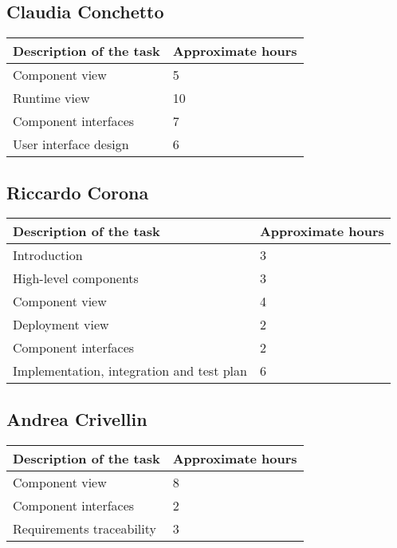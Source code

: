 
%

\subsection{Claudia Conchetto}
\begin{table}[h!]
\begin{tabular}{|l|l|}
\hline
\textbf{Description of the task} & \textbf{Approximate hours} \\ \hline
Component view & 5 \\ \hline
Runtime view & 10 \\ \hline
Component interfaces & 7 \\ \hline
User interface design & 6 \\ \hline
\end{tabular}
\end{table}

\subsection{Riccardo Corona}
\begin{table}[h!]
\begin{tabular}{|l|l|}
\hline
\textbf{Description of the task} & \textbf{Approximate hours} \\ \hline
Introduction & 3 \\ \hline
High-level components & 3 \\ \hline
Component view & 4 \\ \hline
Deployment view & 2 \\ \hline
Component interfaces & 2 \\ \hline
Implementation, integration and test plan & 6 \\ \hline
\end{tabular}
\end{table}

\subsection{Andrea Crivellin}
\begin{table}[h!]
\begin{tabular}{|l|l|}
\hline
\textbf{Description of the task} & \textbf{Approximate hours} \\ \hline
Component view & 8 \\ \hline
Component interfaces & 2 \\ \hline
Requirements traceability & 3 \\ \hline
\end{tabular}
\end{table}

%